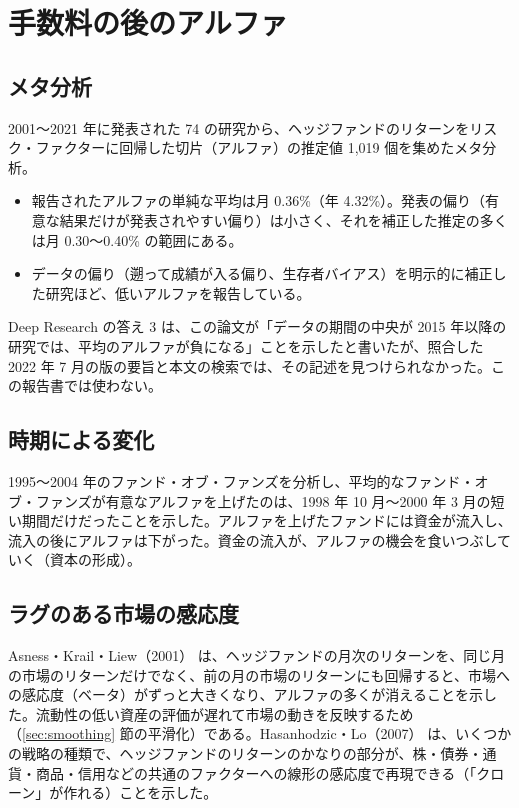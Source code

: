 \section{手数料の後のアルファ}

\subsection{メタ分析}

\begin{paperbox}
2001〜2021 年に発表された 74 の研究から、ヘッジファンドのリターンをリスク・ファクターに回帰した切片（アルファ）の推定値 1,019 個を集めたメタ分析。
\begin{itemize}
\item 報告されたアルファの単純な平均は月 0.36\%（年 4.32\%）。発表の偏り（有意な結果だけが発表されやすい偏り）は小さく、それを補正した推定の多くは月 0.30〜0.40\% の範囲にある。
\item データの偏り（遡って成績が入る偏り、生存者バイアス）を明示的に補正した研究ほど、低いアルファを報告している。
\end{itemize}
\end{paperbox}

Deep Research の答え 3 は、この論文が「データの期間の中央が 2015 年以降の研究では、平均のアルファが負になる」ことを示したと書いたが、照合した 2022 年 7 月の版の要旨と本文の検索では、その記述を見つけられなかった。この報告書では使わない。

\subsection{時期による変化}

\begin{paperbox}
1995〜2004 年のファンド・オブ・ファンズを分析し、平均的なファンド・オブ・ファンズが有意なアルファを上げたのは、1998 年 10 月〜2000 年 3 月の短い期間だけだったことを示した。アルファを上げたファンドには資金が流入し、流入の後にアルファは下がった。資金の流入が、アルファの機会を食いつぶしていく（資本の形成）。
\end{paperbox}

\subsection{ラグのある市場の感応度}

Asness・Krail・Liew（2001）\cite{akl2001} は、ヘッジファンドの月次のリターンを、同じ月の市場のリターンだけでなく、前の月の市場のリターンにも回帰すると、市場への感応度（ベータ）がずっと大きくなり、アルファの多くが消えることを示した。流動性の低い資産の評価が遅れて市場の動きを反映するため（\ref{sec:smoothing} 節の平滑化）である。Hasanhodzic・Lo（2007）\cite{hasanhodziclo2007} は、いくつかの戦略の種類で、ヘッジファンドのリターンのかなりの部分が、株・債券・通貨・商品・信用などの共通のファクターへの線形の感応度で再現できる（「クローン」が作れる）ことを示した。

